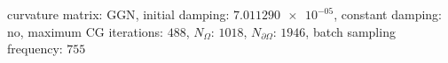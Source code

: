 curvature matrix: $\text{GGN}$, initial damping: $\num[scientific-notation=true]{7.011290e-05}$, constant damping: $\text{no}$, maximum CG iterations: $\num[scientific-notation=false]{488}$, $N_{\Omega}$: $\num[scientific-notation=false]{1018}$, $N_{\partial\Omega}$: $\num[scientific-notation=false]{1946}$, batch sampling frequency: $\num[scientific-notation=false]{755}$